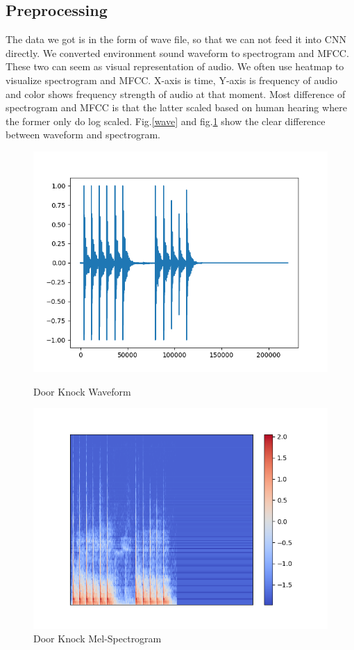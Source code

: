 \subsection{Preprocessing}\label{pre}
The data we got is in the form of wave file, so that we can not feed it into CNN directly. We converted environment sound waveform to spectrogram and MFCC. 
These two can seem as visual representation of audio. We often use heatmap to visualize spectrogram and MFCC. X-axis is time, Y-axis is frequency of audio and color shows frequency strength of audio at that moment. 
Most difference of spectrogram and MFCC is that the latter scaled based on human hearing where the former only do log scaled.
Fig.\ref{wave} and fig.\ref{sp} show the clear difference between waveform and spectrogram.
\begin{figure}[H]
\begin{minipage}[t]{0.5\textwidth}
\centering
\includegraphics[width=\textwidth]{./graph/door_wood_knock_original_wave.png} 
\caption{Door Knock Waveform}
\label{wave}
\end{minipage}
\begin{minipage}[t]{0.5\textwidth}
\centering
\includegraphics[width=\textwidth]{./graph/door_wood_knock_original_melsp.png} 
\caption{Door Knock Mel-Spectrogram}
\label{sp}
\end{minipage}
\end{figure}

